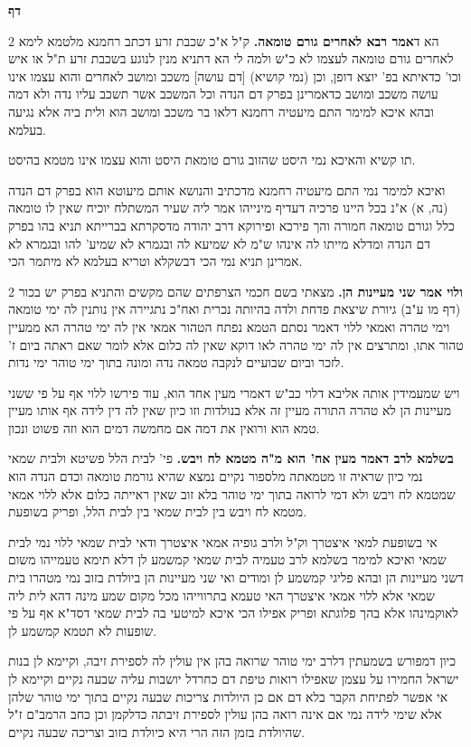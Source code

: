 \documentclass[12pt, openany]{book}
\newcommand{\sethebfont}{
\fontsize{10.5pt}{21.0pt} \selectfont
}
\newcommand{\twocol}[1]{
	{\sethebfont \begin{multicols}{2}
			#1
	\end{multicols}}	
}
\newcommand{\chapname}{}
\newcommand{\newchap}[1]{
	\addcontentsline{toc}{chapter}{#1}
	\renewcommand{\chapname}{#1}
		\begin{center}
			\textbf{%
\fontsize{16pt}{16pt}\selectfont
				#1}
		\end{center}
}
\begin{document}
\newchap{דף }
\twocol{הא ד\textbf{אמר רבא לאחרים גורם טומאה.}  ק"ל א"כ שכבת זרע דכתב רחמנא מלטמא לימא לאחרים גורם טומאה לעצמו לא כ"ש ולמה לי הא דתניא מנין לנוגע בשכבת זרע ת"ל או איש וכו' כדאיתא בפ' יוצא דופן, וכן (נמי קושיא) [דם עושה] משכב ומושב לאחרים והוא עצמו אינו עושה משכב ומושב כדאמרינן בפרק דם הנדה וכל המשכב אשר תשכב עליו נדה ולא דמה ובהא איכא למימר התם מיעטיה רחמנא דלאו בר משכב ומושב הוא ולית ביה אלא נגיעה בעלמא.\par תו קשיא והאיכא נמי היסט שהזוב גורם טומאת היסט והוא עצמו אינו מטמא בהיסט.\par ואיכא למימר נמי התם מיעטיה רחמנא מדכתיב והנושא אותם מיעוטא הוא בפרק דם הנדה (נה, א) א"נ בכל היינו פרכיה דעדיף מינייהו אמר ליה שעיר המשתלח יוכיח שאין לו טומאה כלל וגורם טומאה חמורה והך פירכא ופירוקא דרב יהודה מדסקרתא בברייתא תניא בהו בפרק דם הנדה ומדלא מייתו לה אינהו ש"מ לא שמיעא לה ובגמרא לא שמיע' להו ובגמרא לא אמרינן תניא נמי הכי דבשקלא וטריא בעלמא לא מיתמר הכי. 
\par}
\twocol{\textbf{ולוי אמר שני מעיינות הן.}  מצאתי בשם חכמי הצרפתים שהם מקשים והתניא בפרק יש בכור (דף מו ע"ב) גיורת שיצאת פדחת ולדה בהיותה נכרית ואח"כ נתגיירה אין נותנין לה ימי טומאה וימי טהרה ואמאי ללוי דאמר נסתם הטמא נפתח הטהור אמאי אין לה ימי טהרה הא ממעיין טהור אתו, ומתרצים אין לה ימי טהרה לאו דוקא שאין לה כלום אלא לומר שאם ראתה ביום ז' לזכר וביום שבועיים לנקבה טמאה נדה ומונה בתוך ימי טוהר ימי נדות.\par ויש שמעמידין אותה אליבא דלוי כב"ש דאמרי מעין אחד הוא, עוד פירשו ללוי אף על פי ששני מעיינות הן לא טהרה התורה מעיין זה אלא בנולדות וזו כיון שאין לה דין לידה אף אותו מעיין טמא הוא ורואין את דמה אם מחמשה דמים הוא וזה פשוט ונכון. 
\par\textbf{בשלמא לרב דאמר מעין אח' הוא מ"ה מטמא לח ויבש.}  פי' לבית הלל פשיטא ולבית שמאי נמי כיון שראיה זו מטמאתה מלספור נקיים נמצא שהיא גורמת טומאה וכדם הנדה הוא שמטמא לח ויבש ולא דמי לרואה בתוך ימי טוהר בלא זוב שאין ראייתה כלום אלא ללוי אמאי מטמא לח ויבש בין לבית שמאי בין לבית הלל, ופריק בשופעת.\par  אי בשופעת למאי איצטרך וק"ל ולרב גופיה אמאי איצטרך ודאי לבית שמאי ללוי נמי לבית שמאי ואיכא למימר בשלמא לרב טעמיה לבית שמאי קמשמע לן דלא תימא טעמייהו משום דשני מעיינות הן ובהא פליגי קמשמע לן ומודים ואי שני מעיינות הן ביולדת בזוב נמי מטהרו בית שמאי אלא ללוי אמאי איצטרך האי טעמא בתרווייהו מכל מקום שמע מינה דהא לית ליה לאוקמינהו אלא בהך פלוגתא ופריק אפילו הכי איכא למיטעי בה לבית שמאי דסד"א אף על פי שופעות לא תטמא קמשמע לן.\par  כיון דמפורש בשמעתין דלרב ימי טוהר שרואה בהן אין עולין לה לספירת זיבה, וקיימא לן בנות ישראל החמירו על עצמן שאפילו רואות טיפת דם כחרדל יושבות עליה שבעה נקיים וקיימא לן אי אפשר לפתיחת הקבר בלא דם אם כן היולדות צריכות שבעה נקיים בתוך ימי טוהר שלהן אלא שימי לידה נמי אם אינה רואה בהן עולין לספירת זיבתה כדלקמן וכן כחב הרמב"ם ז"ל שהיולדת בזמן הזה הרי היא כיולדת בזוב וצריכה שבעה נקיים. 
\par}
\end{document}
